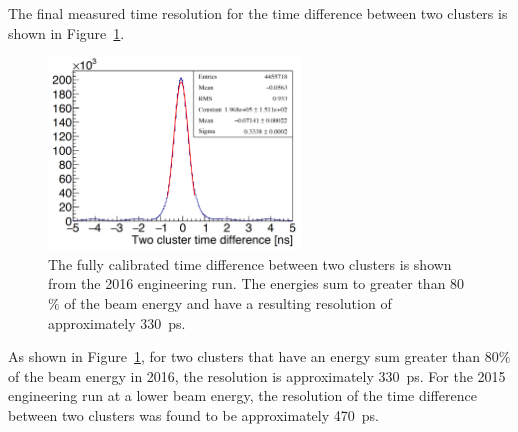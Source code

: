The final measured time resolution for the time difference between two clusters is shown in Figure~\ref{Figure:timeRes2cl}.
\begin{figure}[htb]
  \centering
      \includegraphics[width=0.6\textwidth]{pics/performance/2clusterTres.png}
  \caption[Time resolution for the time difference between two clusters]{The fully calibrated time difference between two clusters is shown from the 2016 engineering run. The energies sum to greater than 80$\%$ of the beam energy and have a resulting resolution of approximately 330~ps.}
  \label{Figure:timeRes2cl}
\end{figure}
As shown in Figure~\ref{Figure:timeRes2cl}, for two clusters that have an energy sum greater than 80$\%$ of the beam energy in 2016, the resolution is approximately 330~ps. For the 2015 engineering run at a lower beam energy, the resolution of the time difference between two clusters was found to be approximately 470~ps. 

%
%
%

